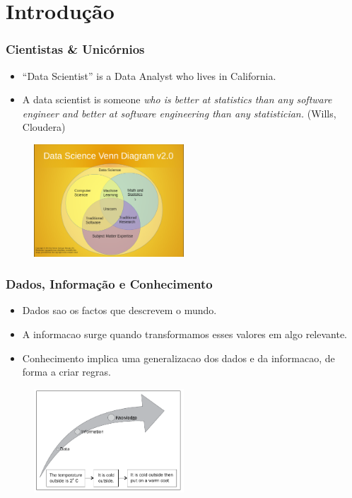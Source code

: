 \documentclass[hyperref={pdfpagelabels=true}]{beamer}
\begin{document}
\section{Introdu\c{c}\~{a}o} 
\begin{frame}
\frametitle{Cientistas \& Unic\'{o}rnios}
\small{ 
      \begin{itemize}    
        \item<1->``Data Scientist'' is a Data Analyst who lives in California.
        \item<1->A data scientist is someone \textit{who is better at statistics than any software engineer and better at software engineering than any statistician.} (Wills, Cloudera)
      \end{itemize}                
}
    \begin{figure}   
         \includegraphics[width=0.5\textwidth]{venn.png}   
    \end{figure}     


\end{frame}


\begin{frame}
\frametitle{Dados, Informa\c{c}\~{a}o e Conhecimento}

\small{ 
      \begin{itemize}    
        \item<1->Dados sao os factos que descrevem o mundo.%
        \item<1->A informacao surge quando transformamos esses valores em algo relevante.%
        \item<1->Conhecimento implica uma generalizacao dos dados e da informacao, de forma a criar regras.%
      \end{itemize}                
}

    \begin{figure}   
         \includegraphics[width=0.5\textwidth]{data.png}   
    \end{figure}     


\end{frame}
\end{document}
